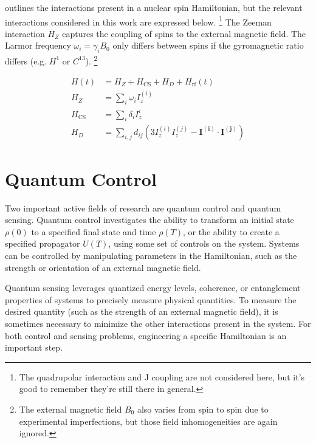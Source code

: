 \cite{1976ii} outlines the interactions present in a nuclear spin Hamiltonian, but the relevant interactions considered in this work are expressed below.%
\footnote{The quadrupolar interaction and J coupling are not considered here, but it's good to remember they're still there in general.}
The Zeeman interaction $H_Z$ captures the coupling of spins to the external magnetic field. The Larmor frequency $\omega_i = \gamma_i B_0$ only differs between spins if the gyromagnetic ratio differs (e.g. $H^1$ or $C^{13}$).%
\footnote{The external magnetic field $B_0$ also varies from spin to spin due to experimental imperfections, but those field inhomogeneities are again ignored.}

\begin{align}\label{eq:nmr-ham}
    H(t) &= H_Z + H_\text{CS} + H_D + H_\text{rf}(t) \\
    H_Z &= \sum_i \omega_i I_z^{(i)} \\
    H_\text{CS} &= \sum_i \delta_i I_z^i \\
    H_D &= \sum_{i,j} d_{ij} \left( 3I_z^{(i)}I_z^{(j)} - \mathbf{I^{(i)}} \cdot \mathbf{I^{(j)}} \right)
\end{align}




\section{Quantum Control}

Two important active fields of research are quantum control and quantum sensing. Quantum control investigates the ability to transform an initial state $\rho(0)$ to a specified final state and time $\rho(T)$, or the ability to create a specified propagator $U(T)$, using some set of controls on the system.\cite{Dong_2010} Systems can be controlled by manipulating parameters in the Hamiltonian, such as the strength or orientation of an external magnetic field.

Quantum sensing leverages quantized energy levels, coherence, or entanglement properties of systems to precisely measure physical quantities. To measure the desired quantity (such as the strength of an external magnetic field), it is sometimes necessary to minimize the other interactions present in the system. For both control and sensing problems, engineering a specific Hamiltonian is an important step.

